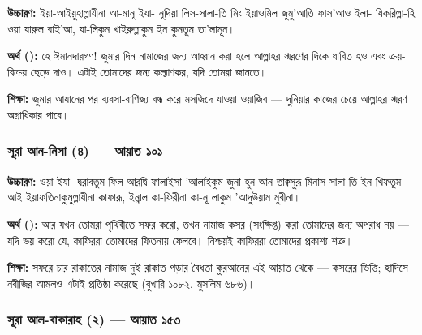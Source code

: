 \begin{center}\end{center}

\textbf{উচ্চারণ:} ইয়া-আইয়ুহাল্লাযীনা আ-মানূ ইযা- নূদিয়া লিস-সালা-তি মিং ইয়াওমিল জুমু'আতি ফাস'আও ইলা- যিকরিল্লা-হি ওয়া যারুল বাই'আ, যা-লিকুম খাইরুল্লাকুম ইন কুনতুম তা'লামূন।

\textbf{অর্থ ():} হে ঈমানদারগণ! জুমার দিন নামাজের জন্য আহ্বান করা হলে আল্লাহর স্মরণের দিকে ধাবিত হও এবং ক্রয়-বিক্রয় ছেড়ে দাও। এটাই তোমাদের জন্য কল্যাণকর, যদি তোমরা জানতে।

\textbf{শিক্ষা:} জুমার আযানের পর ব্যবসা-বাণিজ্য বন্ধ করে মসজিদে যাওয়া ওয়াজিব — দুনিয়ার কাজের চেয়ে আল্লাহর স্মরণ অগ্রাধিকার পাবে।

\subsubsection*{সূরা আন-নিসা (৪) — আয়াত ১০১}

\begin{center}\end{center}

\textbf{উচ্চারণ:} ওয়া ইযা- দ্বরাবতুম ফিল আরদ্বি ফালাইসা 'আলাইকুম জুনা-হুন আন তাক্বসুরূ মিনাস-সালা-তি ইন খিফতুম আই ইয়াফতিনাকুমুল্লাযীনা কাফারূ, ইন্নাল কা-ফিরীনা কা-নূ লাকুম 'আদুউয়াম মুবীনা।

\textbf{অর্থ ():} আর যখন তোমরা পৃথিবীতে সফর করো, তখন নামাজ কসর (সংক্ষিপ্ত) করা তোমাদের জন্য অপরাধ নয় — যদি ভয় করো যে, কাফিররা তোমাদের ফিতনায় ফেলবে। নিশ্চয়ই কাফিররা তোমাদের প্রকাশ্য শত্রু।

\textbf{শিক্ষা:} সফরে চার রাকাতের নামাজ দুই রাকাত পড়ার বৈধতা কুরআনের এই আয়াত থেকে — কসরের ভিত্তি; হাদিসে নবীজির আমলও এটাই প্রতিষ্ঠা করেছে (বুখারি ১০৮২, মুসলিম ৬৮৬)।

\subsubsection*{সূরা আল-বাকারাহ (২) — আয়াত ১৫৩}

\begin{center}\end{center}

